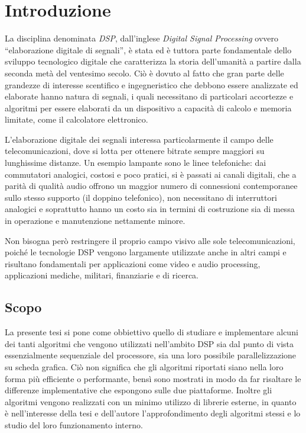 \chapter{Introduzione}
La disciplina denominata \textit{DSP}, dall'inglese \textit{Digital Signal Processing} ovvero ``elaborazione digitale di segnali'', è stata ed è tuttora parte fondamentale dello sviluppo tecnologico digitale che caratterizza la storia dell'umanità a partire dalla seconda metà del ventesimo secolo. Ciò è dovuto al fatto che gran parte delle grandezze di interesse scentifico e ingegneristico che debbono essere analizzate ed elaborate hanno natura di segnali, i quali necessitano di particolari accortezze e algoritmi per essere elaborati da un dispositivo a capacità di calcolo e memoria limitate, come il calcolatore elettronico.

L'elaborazione digitale dei segnali interessa particolarmente il campo delle telecomunicazioni, dove si lotta per ottenere bitrate sempre maggiori su lunghissime distanze. Un esempio lampante sono le linee telefoniche: dai commutatori analogici, costosi e poco pratici, si è passati ai canali digitali, che a parità di qualità audio offrono un maggior numero di connessioni contemporanee sullo stesso supporto (il doppino telefonico), non necessitano di interruttori analogici e soprattutto hanno un costo sia in termini di costruzione sia di messa in operazione e manutenzione nettamente minore.

Non bisogna però restringere il proprio campo visivo alle sole telecomunicazioni, poiché le tecnologie DSP vengono largamente utilizzate anche in altri campi e risultano fondamentali per applicazioni come video e audio processing, applicazioni mediche, militari, finanziarie e di ricerca.

\section{Scopo}
La presente tesi si pone come obbiettivo quello di studiare e implementare alcuni dei tanti algoritmi che vengono utilizzati nell'ambito DSP sia dal punto di vista essenzialmente sequenziale del processore, sia una loro possibile parallelizzazione su scheda grafica. Ciò non significa che gli algoritmi riportati siano nella loro forma più efficiente o performante, bensì sono mostrati in modo da far risaltare le differenze implementative che espongono sulle due piattaforme. Inoltre gli algoritmi vengono realizzati con un minimo utilizzo di librerie esterne, in quanto è nell'interesse della tesi e dell'autore l'approfondimento degli algoritmi stessi e lo studio del loro funzionamento interno.

